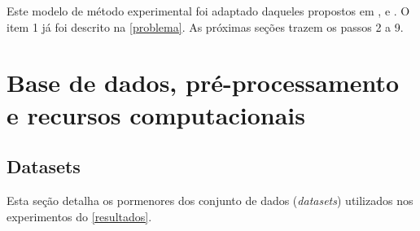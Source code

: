 Este modelo de método experimental foi adaptado daqueles propostos em ,  e . O item 1 já foi descrito na \autoref{problema}. As próximas seções trazem os passos 2 a 9.

\section{Base de dados, pré-processamento e recursos computacionais}\label{base_dados-pre-recursos}
\subsection{Datasets}\label{datasets}
Esta seção detalha os pormenores dos conjunto de dados (\textit{datasets}) utilizados nos experimentos do \autoref{resultados}.

